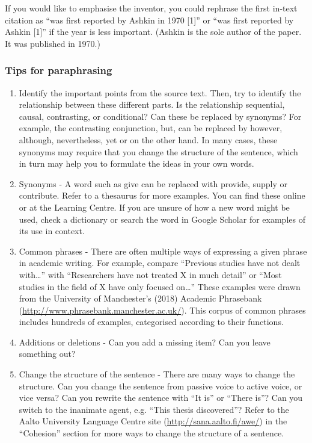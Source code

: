 \documentclass[english, 12pt, a4paper, elec, utf8, a-2b, online]{aaltothesis}
\begin{document}
\vspace{1ex}
If you would like to emphasise the inventor, you could rephrase the first 
in-text citation as “was first reported by Ashkin in 1970 [1]” or “was first 
reported by Ashkin [1]” if the year is less important. (Ashkin is the sole 
author of the paper. It was published in 1970.)


\subsubsection*{Tips for paraphrasing}

\begin{enumerate}
	\item Identify the important points from the source text. Then, try to 
	identify the relationship between these different parts. Is the relationship
	sequential, causal, contrasting, or conditional? Can these be replaced by 
	synonyms? For example, the contrasting conjunction, but, can be replaced by 
	however, although, nevertheless, yet or on the other hand. In many cases, 
	these synonyms may require that you change the structure of the sentence, 
	which in turn may help you to formulate the ideas in your own words.
	\item Synonyms - A word such as give can be replaced with provide, supply or
	contribute. Refer to a thesaurus for more examples. You can find these 
	online or at the Learning Centre. If you are unsure of how a new word might 
	be used, check a dictionary or search the word in Google Scholar for 
	examples of its use in context.
	\item Common phrases - There are often multiple ways of expressing a given 
	phrase in academic writing. For example, compare “Previous studies have not 
	dealt with\ldots” with “Researchers have not treated X in much detail” or 
	“Most studies in the field of X have only focused on\ldots” These examples 
	were drawn from the University of Manchester’s (2018) Academic Phrasebank  (\url{http://www.phrasebank.manchester.ac.uk/}). This corpus of common 
	phrases includes hundreds of examples, categorised according to their 
	functions.
	\item Additions or deletions - Can you add a missing item? Can you leave 
	something out?
	\item Change the structure of the sentence - There are many ways to change 
	the structure. Can you change the sentence from passive voice to active 
	voice, or vice versa? Can you rewrite the sentence with “It is” or “There 
	is”? Can you switch to the inanimate agent, e.g. “This thesis discovered”? 
	Refer to the Aalto University Language Centre site 
	(\url{http://sana.aalto.fi/awe/}) in the “Cohesion” section for more ways to
	change the structure of a sentence.
\end{enumerate}
\end{document}
